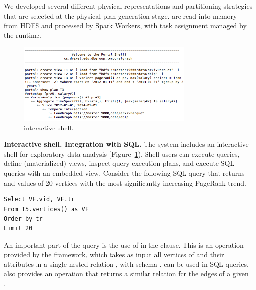 
We developed several different physical representations and
partitioning strategies that are selected at the physical plan
generation stage. \tgs are read into memory from HDFS and processed by
Spark Workers, with task assignment managed by the runtime.

\begin{figure}[t]
\centering
\includegraphics[width=3.4in]{figs/shell.png}
\caption{\sys interactive shell.}
\label{fig:shell}
\end{figure}

{\bf Interactive shell. Integration with SQL.}  The \sys system
includes an interactive shell for exploratory data analysis
(Figure~\ref{fig:shell}). Shell users can execute queries, define
(materialized) views, inspect query execution plans, and execute SQL
queries with an embedded \ql view. Consider the following SQL query
that returns  and  values of 20 vertices with the
most significantly increasing PageRank trend.

\begin{small}
\begin{verbatim}
Select VF.vid, VF.tr
From T5.vertices() as VF
Order by tr
Limit 20
\end{verbatim}
\end{small}

An important part of the query is the use of  in
the  clause. This is an operation provided by the \sys
framework, which takes as input all vertices of  and their
attributes in a single nested relation , with schema
.  can be
used in SQL queries. \sys also provides an operation 
that returns a similar relation for the edges of a given \tg.



